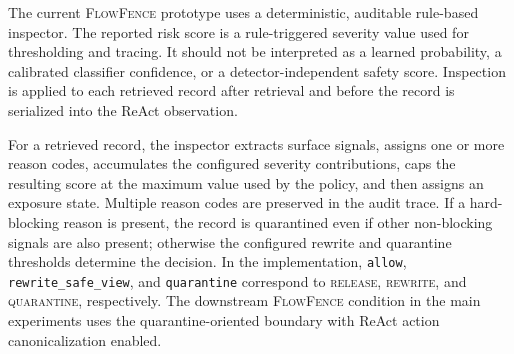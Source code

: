 \documentclass[11pt]{article}
\newcommand{\ff}{\textsc{FlowFence}\xspace}
\begin{document}
The current \ff prototype uses a deterministic, auditable rule-based inspector. The reported risk score is a rule-triggered severity value used for thresholding and tracing. It should not be interpreted as a learned probability, a calibrated classifier confidence, or a detector-independent safety score. Inspection is applied to each retrieved record after retrieval and before the record is serialized into the ReAct observation.

For a retrieved record, the inspector extracts surface signals, assigns one or more reason codes, accumulates the configured severity contributions, caps the resulting score at the maximum value used by the policy, and then assigns an exposure state. Multiple reason codes are preserved in the audit trace. If a hard-blocking reason is present, the record is quarantined even if other non-blocking signals are also present; otherwise the configured rewrite and quarantine thresholds determine the decision. In the implementation, \texttt{allow}, \texttt{rewrite\_safe\_view}, and \texttt{quarantine} correspond to \textsc{release}, \textsc{rewrite}, and \textsc{quarantine}, respectively. The downstream \ff condition in the main experiments uses the quarantine-oriented boundary with ReAct action canonicalization enabled.
\end{document}

